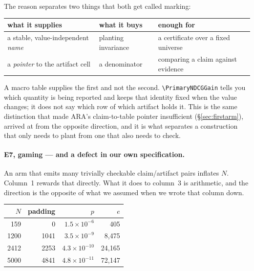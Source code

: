 \documentclass[10pt]{article}
\newcommand{\RM}[1]{{#1}}
\begin{document}
The reason separates two things that both get called marking:

\begin{center}
\small
\begin{tabular}{@{}lll@{}}
\toprule
what it supplies & what it buys & enough for \\
\midrule
a stable, value-independent \emph{name} & planting invariance & a certificate
over a fixed universe \\
a \emph{pointer} to the artifact cell & a denominator & comparing a claim
against evidence \\
\bottomrule
\end{tabular}
\end{center}

\noindent A macro table supplies the first and not the second. \verb|\PrimaryNDCGGain|
tells you which quantity is being reported and keeps that identity fixed when
the value changes; it does not say which row of which artifact holds it. This is
the same distinction that made ARA's claim-to-table pointer insufficient
(\S\ref{sec:firstarm}), arrived at from the opposite direction, and it is what
separates a construction that only needs to plant from one that also needs to
check.

\label{app:e7}
\paragraph{E7, gaming --- and a defect in our own specification.} An arm that
emits many trivially checkable claim/artifact pairs inflates $N$. Column~1
rewards that directly. What it does to column~3 is arithmetic, and the direction
is the opposite of what we assumed when we wrote that column down.

\begin{center}
\small
\begin{tabular}{@{}rrrr@{}}
\toprule
$N$ & padding & $p$ & $e$ \\
\midrule
\RM{159}  & \RM{0}     & \RM{$1.5\times10^{-6}$}  & \RM{405} \\
\RM{1200} & \RM{1041}  & \RM{$3.5\times10^{-9}$}  & \RM{8{,}475} \\
\RM{2412} & \RM{2253}  & \RM{$4.3\times10^{-10}$} & \RM{24{,}165} \\
\RM{5000} & \RM{4841}  & \RM{$4.8\times10^{-11}$} & \RM{72{,}147} \\
\bottomrule
\end{tabular}
\end{center}
\end{document}
